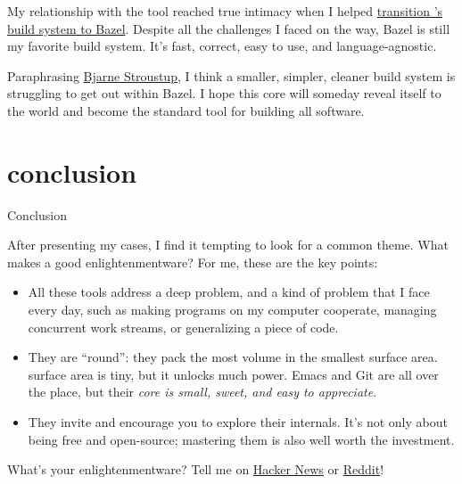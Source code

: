 \documentclass{article}
\begin{document}
My relationship with the tool reached true intimacy when I helped \href{/posts/17-scaling-rust-builds-with-bazel.html}{transition 's build system to Bazel}.
Despite all the challenges I faced on the way, Bazel is still my favorite build system.
It's fast, correct, easy to use, and language-agnostic.

Paraphrasing \href{https://www.stroustrup.com/quotes.html}{Bjarne Stroustup}, I think a smaller, simpler, cleaner build system is struggling to get out within Bazel.
I hope this core will someday reveal itself to the world and become the standard tool for building all software.

\section{conclusion}{Conclusion}

After presenting my cases, I find it tempting to look for a common theme.
What makes a good enlightenmentware?
For me, these are the key points:

\begin{itemize}
  \item
  All these tools address a deep problem, and a kind of problem that I face every day, such as making programs on my computer cooperate, managing concurrent work streams, or generalizing a piece of code.
  \item
  They are ``round'': they pack the most volume in the smallest surface area.
   surface area is tiny, but it unlocks much power.
  Emacs and Git are all over the place, but their \em{core} is small, sweet, and easy to appreciate.
  \item
  They invite and encourage you to explore their internals.
  It's not only about being free and open-source; mastering them is also well worth the investment.
\end{itemize}

What's your enlightenmentware? Tell me on \href{https://news.ycombinator.com/item?id=40419856}{Hacker News} or \href{https://www.reddit.com/r/programming/comments/1cwa1m8/blog_post_enlightenmentware/}{Reddit}!
\end{document}
